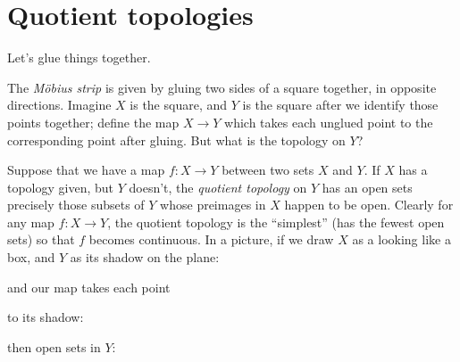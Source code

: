 \section{Quotient topologies}
Let's glue things together.
\begin{exampleAndImage}{1cm}
The \emph{M\"obius strip} is given by gluing two sides of a square together, in opposite directions.
Imagine \(X\) is the square, and \(Y\) is the square after we identify those points together; define the map \(X \to Y\) which takes each unglued point to the corresponding point after gluing.
But what is the topology on \(Y\)?
\tcblower

\end{exampleAndImage}
Suppose that we have a map \(f \colon X \to Y\) between two sets \(X\) and \(Y\).
If \(X\) has a topology given, but \(Y\) doesn't, the \emph{quotient topology}%
%
 on \(Y\) has an open sets precisely those subsets of \(Y\) whose preimages in \(X\) happen to be open.
Clearly for any map \(f \colon X \to Y\), the quotient topology is the ``simplest'' (has the fewest open sets) so that \(f\) becomes continuous.
In a picture, if we draw \(X\) as a looking like a box, and \(Y\) as its shadow on the plane:
\begin{center}
\end{center}
and our map takes each point 
\begin{center}
\end{center}
to its shadow:
\begin{center}
\end{center}
then open sets in \(Y\):
\begin{center}
\end{center}
